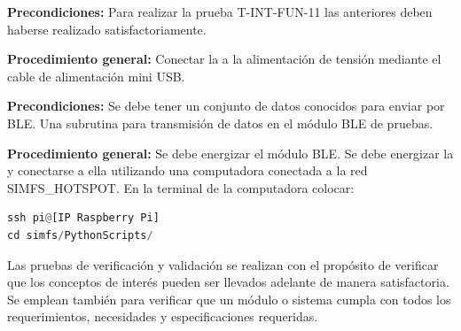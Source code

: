 %
%
%

\label{sec:BancoDePruebas}
%


\label{sec:PlanValidacion}




\textbf{Precondiciones:}
Para realizar la prueba T-INT-FUN-11 las anteriores deben haberse realizado satisfactoriamente.

\textbf{Procedimiento general:}
Conectar la \rspi a la alimentación de tensión mediante el cable de alimentación mini USB.





\textbf{Precondiciones:} Se debe tener un conjunto de datos conocidos para enviar por BLE. Una subrutina para transmisión de datos en el módulo BLE de pruebas.

\textbf{Procedimiento general:} Se debe energizar el módulo BLE. Se debe energizar la \rspi y conectarse a ella utilizando una computadora conectada a la red
SIMFS\_HOTSPOT. En la terminal de la computadora colocar:
\begin{lstlisting}[language=Python]
ssh pi@[IP Raspberry Pi] 
cd simfs/PythonScripts/
\end{lstlisting}





\label{sec:MatrizTrazabilidad}



Las pruebas de verificación y validación se realizan con el propósito de verificar que los conceptos de interés pueden ser llevados adelante de manera satisfactoria. Se emplean también para verificar que un módulo o sistema cumpla con todos los requerimientos, necesidades y especificaciones requeridas.

